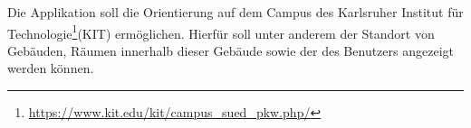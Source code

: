 
Die Applikation soll die Orientierung auf dem \Gls{Campus} des Karlsruher Institut für Technologie\footnote{\href{https://www.kit.edu/kit/campus_sued_pkw.php/}{https://www.kit.edu/kit/campus\_sued\_pkw.php/}}(\Gls{KIT})
 ermöglichen. Hierfür soll unter anderem der Standort von Gebäuden, Räumen innerhalb dieser Gebäude sowie der
 des \Gls{Benutzer}s angezeigt werden können.
 